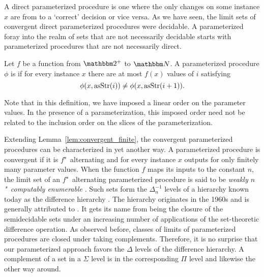 A direct parameterized procedure is one where the only changes on some instance $x$ are from  to a `correct' decision or vice versa.
As we have seen, the limit sets of convergent direct parameterized procedures were decidable.
A parameterized foray into the realm of sets that are not necessarily decidable starts with parameterized procedures that are not necessarily direct.
\begin{definition}
  Let $f$ be a function from $\binary^+$ to $\bbN$.
  A parameterized procedure $\phi$ is  if for every instance $x$ there are at most $f(x)$ values of $i$ satisfying
  \begin{equation*}
    \phi(x, \operatorname{asStr}(i)) \neq \phi(x, \operatorname{asStr}(i + 1)).
  \end{equation*}
\end{definition}

Note that in this definition, we have imposed a linear order on the parameter values.
In the presence of a parameterization, this imposed order need not be related to the inclusion order on the slices of the parameterization.

Extending Lemma~\ref{lem:convergent_finite}, the convergent parameterized procedures can be characterized in yet another way.
A parameterized procedure is convergent if it is $f$"~alternating and for every instance $x$ outputs  for only finitely many parameter values.
When the function $f$ maps its inputs to the constant $n$, the limit set of an $f$"~alternating parameterized procedure is said to be \emph{weakly $n$"~computably enumerable} \parencite{odifreddi1992classical,epstein1981hierarchies}.
Such sets form the $\Delta^{-1}_n$ levels of a hierarchy known today as the difference hierarchy \parencite{downey2010algorithmic}.
The hierarchy originates in the 1960s \parencite{putnam1965trial,gold1965limiting,ershov1968hierarchyi} and is generally attributed to \citeauthor{ershov1968hierarchyi}.
It gets its name from being the closure of the semidecidable sets under an increasing number of applications of the set-theoretic difference operation.
As observed before, classes of limits of parameterized procedures are closed under taking complements.
Therefore, it is no surprise that our parameterized approach favors the $\Delta$ levels of the difference hierarchy.
A complement of a set in a $\Sigma$ level is in the corresponding $\Pi$ level and likewise the other way around.

